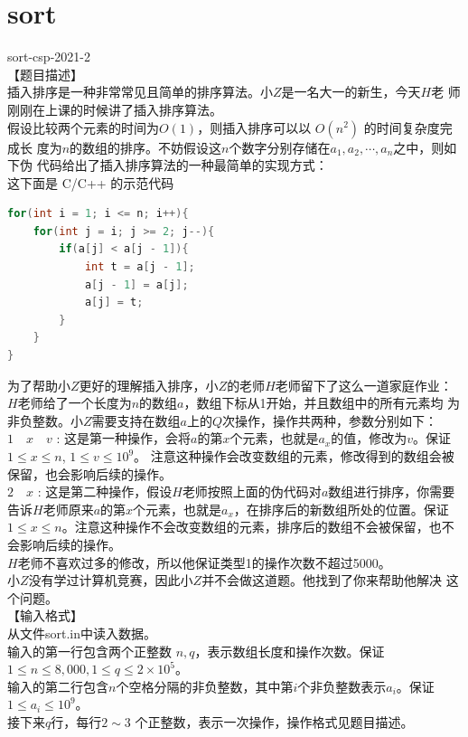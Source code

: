 \documentclass[12pt,twiside,a4paper]{ctexbook}
\numberwithin{chapter}{part}
\begin{document}
\section{sort}
sort-csp-2021-2\\
【题目描述】\\
插入排序是一种非常常见且简单的排序算法。小$Z$是一名大一的新生，今天$H$老
师刚刚在上课的时候讲了插入排序算法。\\
假设比较两个元素的时间为$O(1)$，则插入排序可以以 $O(n^2)$ 的时间复杂度完成长
度为$n$的数组的排序。不妨假设这$n$个数字分别存储在$a_1, a_2, \cdots, a_n$之中，则如下伪
代码给出了插入排序算法的一种最简单的实现方式：\\
这下面是 C/C++ 的示范代码
\begin{lstlisting}[language=C++,breaklines=true]
for(int i = 1; i <= n; i++){
	for(int j = i; j >= 2; j--){
		if(a[j] < a[j - 1]){
			int t = a[j - 1];
			a[j - 1] = a[j];
			a[j] = t;
		}
	}
}
\end{lstlisting}
为了帮助小$Z$更好的理解插入排序，小$Z$的老师$H$老师留下了这么一道家庭作业：\\
$H$老师给了一个长度为$n$的数组$a$，数组下标从1开始，并且数组中的所有元素均
为非负整数。小$Z$需要支持在数组$a$上的$Q$次操作，操作共两种，参数分别如下：\\
$1\quad x\quad v$ : 这是第一种操作，会将$a$的第$x$个元素，也就是$a_x$的值，修改为$v$。保证
$1 \leq x \leq n$, $1 \leq v \leq 10^9$。
注意这种操作会改变数组的元素，修改得到的数组会被保留，也会影响后续的操作。\\
$2\quad x$ : 这是第二种操作，假设$H$老师按照上面的伪代码对$a$数组进行排序，你需要
告诉$H$老师原来$a$的第$x$个元素，也就是$a_x$，在排序后的新数组所处的位置。保证$1\leq x \leq n$。注意这种操作不会改变数组的元素，排序后的数组不会被保留，也不会影响后续的操作。\\
$H$老师不喜欢过多的修改，所以他保证类型1的操作次数不超过5000。\\
小$Z$没有学过计算机竞赛，因此小$Z$并不会做这道题。他找到了你来帮助他解决
这个问题。\\
【输入格式】\\
从文件sort.in中读入数据。\\
输入的第一行包含两个正整数 $n, q$，表示数组长度和操作次数。保证 $1 \leq n \leq
8, 000, 1 \leq q \leq 2 \times 10^5$。\\
输入的第二行包含$n$个空格分隔的非负整数，其中第$i$个非负整数表示$a_i$。保证
$1 \leq a_i \leq 10^9$。\\
接下来$q$行，每行$2 \sim 3$ 个正整数，表示一次操作，操作格式见题目描述。\\
\end{document}
